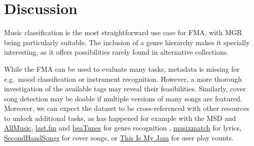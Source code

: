 \documentclass{article}
\begin{document}
\section{Discussion} %





Music classification is the most straightforward use case for FMA, with MGR being particularly suitable. The inclusion of a genre hierarchy makes it specially interesting, as it offers possibilities rarely found in alternative collections.

While the FMA can be used to evaluate many tasks, metadata is missing for e.g.\ mood classification or instrument recognition. However, a more thorough investigation of the available tags may reveal their feasibilities. Similarly, cover song detection may be doable if multiple versions of many songs are featured.
Moreover, we can expect the dataset to be cross-referenced with other resources to unlock additional tasks, as has happened for example with the MSD and \href{http://www.allmusic.com}{AllMusic}, \href{https://www.last.fm}{last.fm} and \href{https://beatunes.com}{beaTunes} for genre recognition \cite{msd_features, msd_genres}, \href{https://musixmatch.com}{musixmatch} for lyrics, \href{https://secondhandsongs.com}{SecondHandSongs} for cover songs, or \href{https://www.thisismyjam.com}{This Is My Jam} for user play counts.
\end{document}
